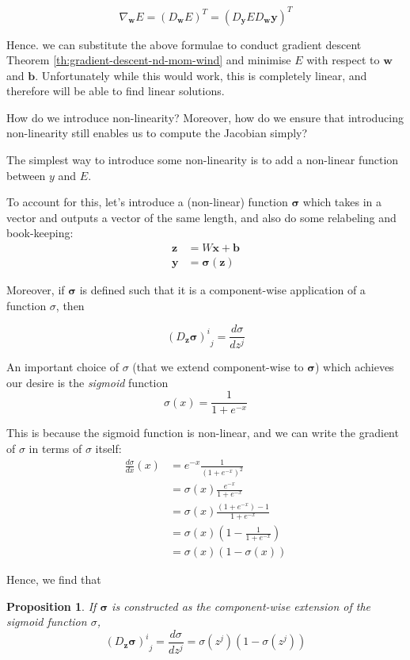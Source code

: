 \documentclass[a4paper]{article}
\theoremstyle{plain} %
\newtheorem{proposition}[theorem]{Proposition}
\theoremstyle{definition} %
\numberwithin{equation}{subsection}
\newcommand{\vx}{{\textbf{x}}}
\newcommand{\vy}{{\textbf{y}}}
\newcommand{\vz}{{\textbf{z}}}
\newcommand{\vw}{{\textbf{w}}}
\newcommand{\vb}{{\textbf{b}}}
\newcommand{\vsigma}{{\bm{\sigma}}} %
\begin{document}
\[ \nabla_\vw E = (D_\vw E)^T = (D_\vy E D_\vw \vy)^T \]

Hence. we can substitute the above formulae to conduct gradient descent Theorem \ref{th:gradient-descent-nd-mom-wind} 
and minimise $E$ with respect to $\vw$ and $\vb$. 
Unfortunately while this would work, this is completely linear, and therefore will be able to find linear solutions.

How do we introduce non-linearity? Moreover, how do we ensure that introducing non-linearity still enables us to compute the Jacobian simply?

The simplest way to introduce some non-linearity is to add a non-linear function between $y$ and $E$.

To account for this, let's introduce a (non-linear) function $\vsigma$ which takes in a vector and outputs a vector of the same length, 
and also do some relabeling and book-keeping:
\begin{align*}
  \vz &= W \vx + \vb \\
  \vy &= \vsigma (\vz)
\end{align*}

Moreover, if $\vsigma$ is defined such that it is a component-wise application of a function $\sigma$, then 

\[ {(D_\vz \vsigma)^i}_j =  \frac{d\sigma}{dz^j}\]

An important choice of $\sigma$ (that we extend component-wise to $\vsigma$) which achieves our desire is the \emph{sigmoid} function
\[ \sigma(x) = \frac{1}{1 + e^{-x}}\]

This is because the sigmoid function is non-linear, and we can write the gradient of $\sigma$ in terms of $\sigma$ itself:
 \begin{align*}
  \frac{d \sigma}{dx}(x) &= e^{-x} \frac{1}{(1 + e^{-x})^2} \\
   &= \sigma(x) \frac{e^{-x} }{1 + e^{-x}} \\
   &= \sigma(x) \frac{(1 + e^{-x} ) -1}{1 + e^{-x}} \\
   &= \sigma(x) \left(1 -\frac{1}{1 + e^{-x}} \right)\\
   &= \sigma(x) (1 - \sigma(x))
 \end{align*}

Hence, we find that 

\begin{proposition} \label{prop:jacobian-sigmoid}
If $\vsigma$ is constructed as the component-wise extension of the sigmoid function $\sigma$, 
\[ {(D_\vz \vsigma)^i}_j =  \frac{d\sigma}{dz^j} = \sigma(z^j) (1 - \sigma(z^j))\]
  
\end{proposition}
\end{document}
